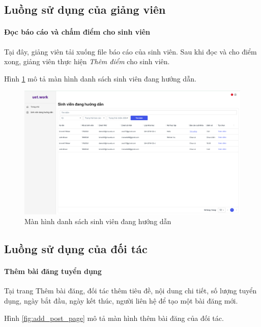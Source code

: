 \documentclass[./../main.tex]{subfiles}
\begin{document}
\subsection{Luồng sử dụng của giảng viên}

\paragraph*{Đọc báo cáo và chấm điểm cho sinh viên}

Tại đây, giảng viên tải xuống file báo cáo của sinh viên. Sau khi đọc và cho điểm xong, giảng viên thực hiện \emph{Thêm điểm} cho sinh viên.

Hình \ref{fig:working_student_page} mô tả màn hình danh sách sinh viên đang hướng dẫn.

\begin{figure}[]
	\includegraphics[width=\linewidth]{./images/image8.png}
	\caption{Màn hình danh sách sinh viên đang hướng dẫn}
	\label{fig:working_student_page}
\end{figure}

\subsection{Luồng sử dụng của đối tác}

\paragraph*{Thêm bài đăng tuyển dụng}

Tại trang Thêm bài đăng, đối tác thêm tiêu đề, nội dung chi tiết, số lượng tuyển dụng, ngày bắt đầu, ngày kết thúc, người liên hệ để tạo một bài đăng mới.

Hình \ref{fig:add_post_page} mô tả màn hình thêm bài đăng của đối tác.
\end{document}

